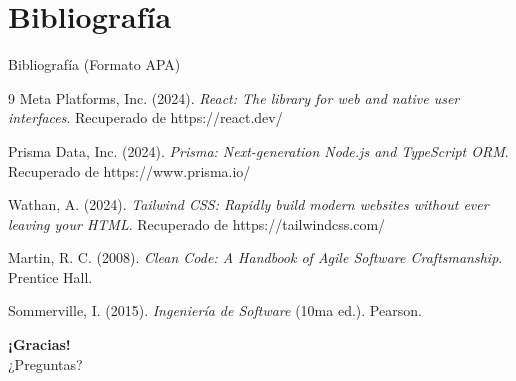 \documentclass{beamer}
\begin{document}
\section{Bibliografía}
\begin{frame}{Bibliografía (Formato APA)}
  \begin{thebibliography}{9}
      Meta Platforms, Inc. (2024). \textit{React: The library for web and native user interfaces}. Recuperado de https://react.dev/
      
      Prisma Data, Inc. (2024). \textit{Prisma: Next-generation Node.js and TypeScript ORM}. Recuperado de https://www.prisma.io/
      
      Wathan, A. (2024). \textit{Tailwind CSS: Rapidly build modern websites without ever leaving your HTML}. Recuperado de https://tailwindcss.com/
      
      Martin, R. C. (2008). \textit{Clean Code: A Handbook of Agile Software Craftsmanship}. Prentice Hall.
      
      Sommerville, I. (2015). \textit{Ingeniería de Software} (10ma ed.). Pearson.
  \end{thebibliography}
\end{frame}

\begin{frame}
  \begin{center}
      \Huge \textbf{¡Gracias!} \\
      \vspace{0.5cm}
      \Large ¿Preguntas?
  \end{center}
\end{frame}
\end{document}
